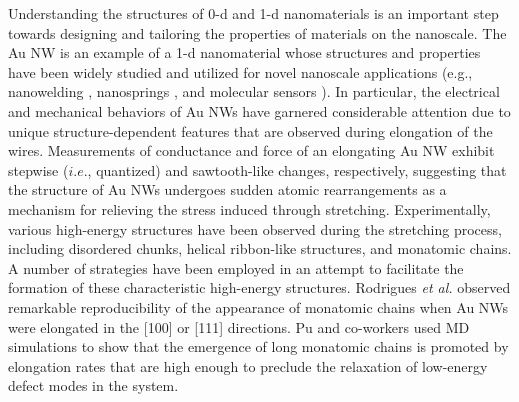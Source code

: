 \documentclass[10pt]{report}  %
\newcommand\findent{\hspace*{\parindent}}
\begin{document}
\findent Understanding the structures of 0-d and 1-d nanomaterials is an important step towards designing and tailoring the properties of materials on the nanoscale.\cite{Pan:2010}  The Au NW is an example of a 1-d nanomaterial whose structures and properties have been widely studied \cite{Rubio:1996,Scheer:1998,Yanson:1998,Marszalek:2000,Tsutsui_nl:2008,Rodrigues:2001,Rodrigues:2000,Oshima:2003,Kondo:2000,Kondo:1997,He:2002,Huo:2008,Coura:2004,Pu:2008,Pu_JCP:2007,Sato:2005,Lin:2005,Wang:2007,Koh:2006,Wang:2001,Wen:2010,Weinberger:2010} and utilized for novel nanoscale applications (e.g., nanowelding \cite{Lu:2010}, nanosprings \cite{Xu_nanosprings:2010}, and molecular sensors \cite{Shi:2010}).  In particular, the electrical and mechanical behaviors of Au NWs have garnered considerable attention due to unique structure-dependent features that are observed during elongation of the wires.  Measurements of conductance and force of an elongating Au NW exhibit stepwise ($i.e.$, quantized) \cite{Rubio:1996,Scheer:1998,Yanson:1998,Marszalek:2000,Tsutsui_nl:2008} and sawtooth-like \cite{Marszalek:2000} changes, respectively, suggesting that the structure of Au NWs undergoes sudden atomic rearrangements as a mechanism for relieving the stress induced through stretching. Experimentally, various high-energy structures have been observed during the stretching process, including disordered chunks,\cite{Kondo:1997} helical ribbon-like structures, \cite{Coura:2004,Oshima:2003,Kondo:2000,Rodrigues:2000} and monatomic chains.\cite{Coura:2004,Rodrigues:2001,Rodrigues:2000}  A number of strategies have been employed in an attempt to facilitate the formation of these characteristic high-energy structures.  Rodrigues \emph{et al.} \cite{Rodrigues:2000} observed remarkable reproducibility of the appearance of monatomic chains when Au NWs were elongated in the [100] or [111] directions.  Pu and co-workers \cite{Pu:2008} used MD simulations to show that the emergence of long monatomic chains is promoted by elongation rates that are high enough to preclude the relaxation of low-energy defect modes in the system.  
\end{document}
